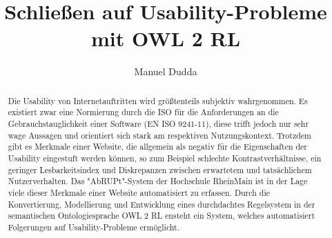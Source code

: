 \documentclass[runningheads,a4paper]{llncs}
\begin{document}
\mainmatter  %

\title{Schließen auf Usability-Probleme mit OWL 2 RL}


%
%
\author{Manuel Dudda}
%


%
%

\maketitle


\begin{abstract}
Die Usability von Internetauftritten wird größtenteils subjektiv wahrgenommen. Es existiert zwar eine Normierung durch die ISO für die Anforderungen an die Gebrauchstauglichkeit einer Software (EN ISO 9241-11), diese trifft jedoch nur sehr wage Aussagen und orientiert sich stark am respektiven Nutzungskontext. Trotzdem gibt es Merkmale einer Website, die allgemein als negativ für die Eigenschaften der Usability eingestuft werden können, so zum Beispiel schlechte Kontrastverhältnisse, ein geringer Lesbarkeitsindex und Diskrepanzen zwischen erwartetem und tatsächlichem Nutzerverhalten. Das "AbRUPt"-System der Hochschule RheinMain ist in der Lage viele dieser Merkmale einer Website automatisiert zu erfassen. Durch die Konvertierung, Modellierung und Entwicklung eines durchdachtes Regelsystem in der semantischen Ontologiesprache OWL 2 RL ensteht ein System, welches automatisiert Folgerungen auf Usability-Probleme ermöglicht.
\end{abstract}
\end{document}
